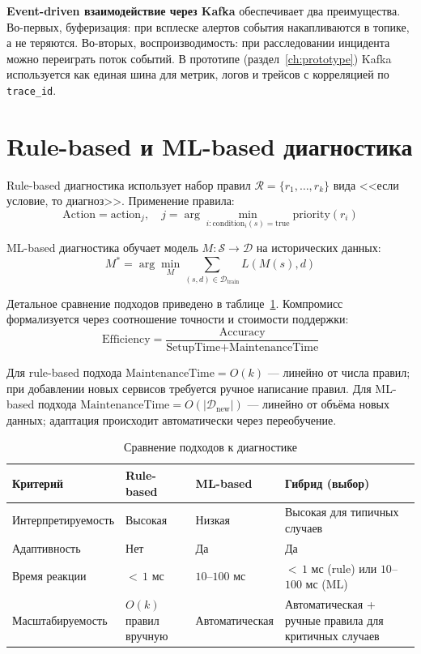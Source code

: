 \textbf{Event-driven взаимодействие через Kafka} обеспечивает два преимущества. Во-первых, буферизация: при всплеске алертов события накапливаются в топике, а не теряются. Во-вторых, воспроизводимость: при расследовании инцидента можно переиграть поток событий. В прототипе (раздел~\ref{ch:prototype}) Kafka используется как единая шина для метрик, логов и трейсов с корреляцией по \texttt{trace\_id}.

\section{Rule-based и ML-based диагностика}
\label{sec:rule_vs_ml}

Rule-based диагностика использует набор правил $\mathcal{R} = \{r_1, \ldots, r_k\}$ вида <<если условие, то диагноз>>. Применение правила:
\begin{equation}
\text{Action} = \text{action}_j, \quad j = \arg\min_{i: \text{condition}_i(s) = \text{true}} \text{priority}(r_i)
\label{eq:rule_application_paradigm}
\end{equation}

ML-based диагностика обучает модель $M: \mathcal{S} \to \mathcal{D}$ на исторических данных:
\begin{equation}
M^* = \arg\min_{M} \sum_{(s, d) \in \mathcal{D}_{\text{train}}} L(M(s), d)
\label{eq:ml_training_paradigm}
\end{equation}

Детальное сравнение подходов приведено в таблице~\ref{tab:diagnosis_approaches}. Компромисс формализуется через соотношение точности и стоимости поддержки:
\begin{equation}
\text{Efficiency} = \frac{\text{Accuracy}}{\text{SetupTime} + \text{MaintenanceTime}}
\label{eq:diagnosis_efficiency_paradigm}
\end{equation}

Для rule-based подхода $\text{MaintenanceTime} = O(k)$ --- линейно от числа правил; при добавлении новых сервисов требуется ручное написание правил. Для ML-based подхода $\text{MaintenanceTime} = O(|\mathcal{D}_{\text{new}}|)$ --- линейно от объёма новых данных; адаптация происходит автоматически через переобучение.

\begin{table}[H]
\centering
\caption{Сравнение подходов к диагностике}
\label{tab:diagnosis_approaches}
\small
\begin{tabularx}{\textwidth}{|p{2.5cm}|X|X|X|}
\hline
\textbf{Критерий} & \textbf{Rule-based} & \textbf{ML-based} & \textbf{Гибрид (выбор)} \\
\hline
Интерпрети\-руемость & Высокая & Низкая & Высокая для типичных случаев \\
\hline
Адаптивность & Нет & Да & Да \\
\hline
Время реакции & ${<}\,1$ мс & $10$--$100$ мс & ${<}\,1$ мс (rule) или $10$--$100$ мс (ML) \\
\hline
Масштаби\-руемость & $O(k)$ правил вручную & Автома\-тическая & Автоматическая + ручные правила для критичных случаев \\
\hline
\end{tabularx}
\end{table}

